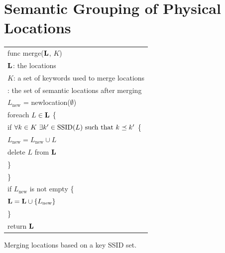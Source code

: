 \section{Semantic Grouping of Physical Locations}

\begin{algorithm}[t]
    \centering
    \begin{tabular}{|l|} \hline
        func merge($\mathbf{L}$, $K$) \\
        \RRR $\mathbf{L}$: the locations \\
        \RRR $K$: a set of keywords used to merge locations \\
        \RRR {\em returns}: the set of semantic locations after merging\\ \hline
        $L_\mathrm{new}$ = newlocation($\emptyset$)\\
        foreach $L\in\mathbf{L}$ \{ \\
            \RRR if $\forall k\in K\ \exists k'\in\mathrm{SSID}(L)\ \mathrm{such\ that}\ k\preceq k'$ \{ \\
            \RRR \RRR $L_\mathrm{new} = L_\mathrm{new}\cup L$ \\
            \RRR \RRR delete $L$ from $\mathbf{L}$ \\
            \RRR \} \\
        \} \\
        if $L_\mathrm{new}$ is not empty \{ \\
        \RRR $\mathbf{L} = \mathbf{L}\cup\{L_\mathrm{new}\}$ \\
        \} \\
        return $\mathbf{L}$ \\ \hline
    \end{tabular}
    \vspace{0.4cm}
    \caption{Merging locations based on a key SSID set.}
    \label{alg:merge}
\end{algorithm}

